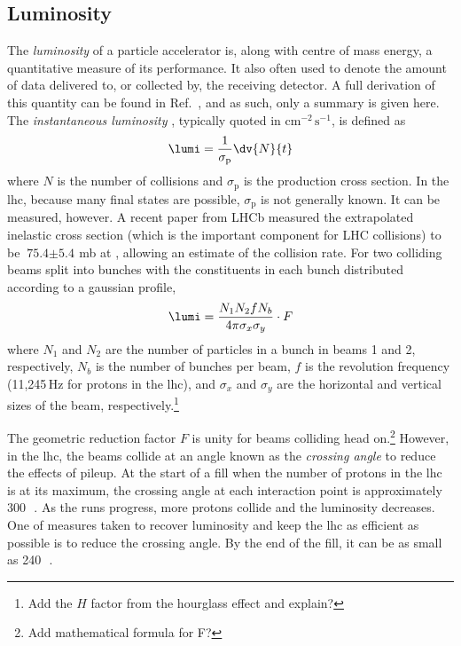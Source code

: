 



\subsection{Luminosity}
\label{subsec:luminosity}

The \emph{\gls{luminosity}} of a particle accelerator is, along with centre of mass energy, a quantitative measure of its performance. It also often used to denote the amount of data delivered to, or collected by, the receiving detector. A full derivation of this quantity can be found in Ref.~, and as such, only a summary is given here. The \emph{instantaneous luminosity} \lumi, typically quoted in $\text{cm}^{-2}\,\text{s}^{-1}$, is defined as
\begin{equation}
    \lumi = \frac{1}{\sigma_{\mathrm{p}}} \dv{N}{t}
    \label{eq:lumi_instantaneous}
\end{equation}
where $N$ is the number of collisions and $\sigma_{\mathrm{p}}$ is the production cross section. In the \acrshort{lhc}, because many final states are possible, $\sigma_{\mathrm{p}}$ is not generally known. It can be measured, however. A recent paper from LHCb measured the extrapolated inelastic cross section (which is the important component for LHC collisions) to be $\text{75.4} \pm \text{5.4}$\,mb at \comruntwo \cite{Aaij:2018okq}, allowing an estimate of the collision rate. For two colliding beams split into bunches with the constituents in each bunch distributed according to a gaussian profile,
\begin{equation}
    \lumi = \frac{N_1 N_2 f N_b}{4 \pi \sigma_x \sigma_y} \cdot F %
    \label{eq:lumi_inst_head_on_colliding_beams}
\end{equation}
where $N_1$ and $N_2$ are the number of particles in a bunch in beams 1 and 2, respectively, $N_b$ is the number of bunches per beam, $f$ is the revolution frequency (11,245\,Hz for protons in the \acrshort{lhc}), and $\sigma_x$ and $\sigma_y$ are the horizontal and vertical sizes of the beam, respectively.\footnote{Add the $H$ factor from the hourglass effect and explain?}

The geometric reduction factor $F$ is unity for beams colliding head on.\footnote{Add mathematical formula for F?} However, in the \acrshort{lhc}, the beams collide at an angle known as the \emph{crossing angle} to reduce the effects of \gls{pileup}. At the start of a fill when the number of protons in the \acrshort{lhc} is at its maximum, the crossing angle at each interaction point is approximately 300\,\si{\micro{}}. As the runs progress, more protons collide and the luminosity decreases. One of measures taken to recover luminosity and keep the \acrshort{lhc} as efficient as possible is to reduce the crossing angle. By the end of the fill, it can be as small as 240\,\si{\micro{}}.

